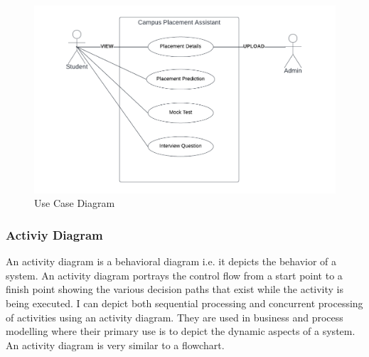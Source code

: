 \documentclass[12pt]{article}
\begin{document}
\begin{figure}[H]
\begin{center}
\includegraphics[scale=.8]{use case diagram}
\caption{Use Case Diagram}
\end{center}
\end{figure}

\newpage
\subsubsection{Activiy Diagram}

An activity diagram is a behavioral diagram i.e. it depicts the behavior of a system. An activity diagram portrays the control flow from a start point to a finish point showing the various decision paths that exist while the activity is being executed. I can depict both sequential processing and concurrent processing of activities using an activity diagram. They are used in business and process modelling where their primary use is to depict the dynamic aspects of a system. An activity diagram is very similar to a flowchart.
\end{document}
